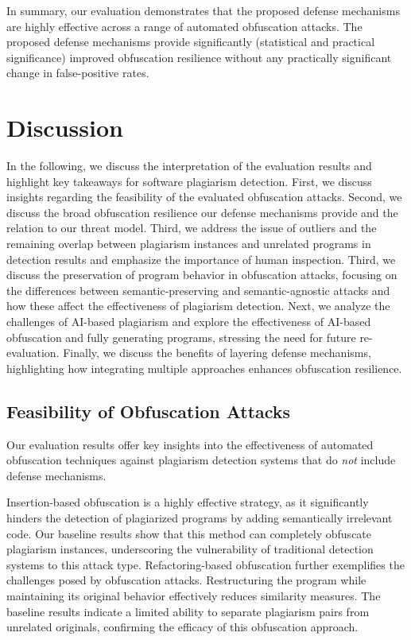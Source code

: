 In summary, our evaluation demonstrates that the proposed defense mechanisms are highly effective across a range of automated obfuscation attacks.
The proposed defense mechanisms provide significantly (statistical and practical significance) improved obfuscation resilience without any practically significant change in false-positive rates.

\section{Discussion}\label{sec:eval-discussion}%
In the following, we discuss the interpretation of the evaluation results and highlight key takeaways for software plagiarism detection.
First, we discuss insights regarding the feasibility of the evaluated obfuscation attacks.
Second, we discuss the broad obfuscation resilience our defense mechanisms provide and the relation to our threat model.
Third, we address the issue of outliers and the remaining overlap between plagiarism instances and unrelated programs in detection results and emphasize the importance of human inspection.
Third, we discuss the preservation of program behavior in obfuscation attacks, focusing on the differences between semantic-preserving and semantic-agnostic attacks and how these affect the effectiveness of plagiarism detection.
Next, we analyze the challenges of AI-based plagiarism and explore the effectiveness of AI-based obfuscation and fully generating programs, stressing the need for future re-evaluation.
Finally, we discuss the benefits of layering defense mechanisms, highlighting how integrating multiple approaches enhances obfuscation resilience.

\subsection{Feasibility of Obfuscation Attacks}
Our evaluation results offer key insights into the effectiveness of automated obfuscation techniques against plagiarism detection systems that do \textit{not} include defense mechanisms.

Insertion-based obfuscation is a highly effective strategy, as it significantly hinders the detection of plagiarized programs by adding semantically irrelevant code. Our baseline results show that this method can completely obfuscate plagiarism instances, underscoring the vulnerability of traditional detection systems to this attack type.
%
Refactoring-based obfuscation further exemplifies the challenges posed by obfuscation attacks. Restructuring the program while maintaining its original behavior effectively reduces similarity measures. The baseline results indicate a limited ability to separate plagiarism pairs from unrelated originals, confirming the efficacy of this obfuscation approach.

